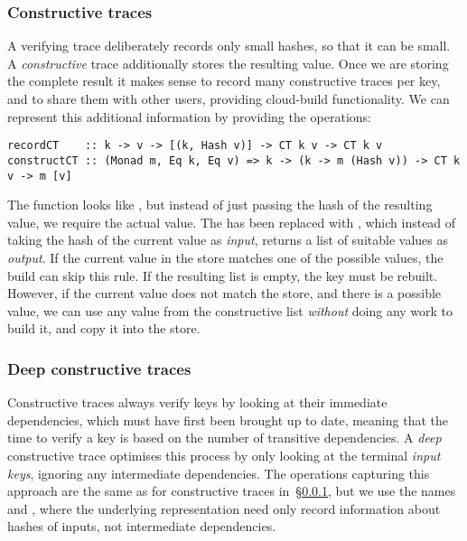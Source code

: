 \subsubsection{Constructive traces}\label{sec-constructive-traces}

A verifying trace deliberately records only small hashes, so that it can be small.
A \emph{constructive} trace additionally stores the resulting value.
Once we are storing the complete result it makes sense
to record many constructive traces per key, and to share them with other users,
providing cloud-build functionality. We can represent this additional
information by providing the operations:

\begin{verbatim}
recordCT    :: k -> v -> [(k, Hash v)] -> CT k v -> CT k v
constructCT :: (Monad m, Eq k, Eq v) => k -> (k -> m (Hash v)) -> CT k v -> m [v]
\end{verbatim}

\noindent
The function  looks like , but instead of just passing
the hash of the resulting value, we require the actual value. The 
has been replaced with , which instead of taking the hash of the
current value as \emph{input}, returns a list of suitable values as \emph{output}.
If the current value in the store
matches one of the possible values, the build can skip this rule. If the
resulting list is empty, the key must be rebuilt. However, if the current value
does not match the store, and there is a possible value, we can use any value
from the constructive list \emph{without} doing any work to build it, and copy
it into the store.

\subsubsection{Deep constructive traces}\label{sec-deep-constructive-traces}

Constructive traces always verify keys by looking at their immediate
dependencies, which must have first been brought up to date, meaning that the
time to verify a key is based on the number of transitive dependencies. A
\emph{deep} constructive trace optimises this process by only looking at the
terminal \emph{input keys}, ignoring any intermediate dependencies. The operations
capturing this approach are the same as for constructive traces
in~\S\ref{sec-constructive-traces}, but we use the names  and
, where the underlying  representation need only record
information about hashes of inputs, not intermediate dependencies.

